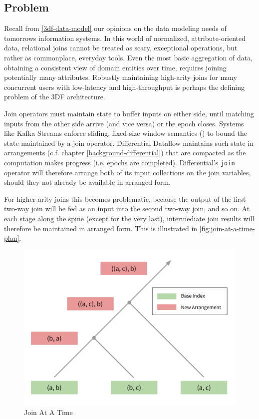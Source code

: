 \documentclass[../catalog.tex]{subfiles}
\begin{document}
\subsection{Problem}

Recall from \autoref{3df-data-model} our opinions on the data modeling
needs of tomorrows information systems. In this world of normalized,
attribute-oriented data, relational joins cannot be treated as scary,
exceptional operations, but rather as commonplace, everyday
tools. Even the most basic aggregation of data, obtaining a consistent
view of domain entities over time, requires joining potentially many
attributes. Robustly maintaining high-arity joins for many concurrent
users with low-latency and high-throughput is perhaps the defining
problem of the 3DF architecture.

Join operators must maintain state to buffer inputs on either side,
until matching inputs from the other side arrive (and vice versa) or
the epoch closes. Systems like Kafka Streams enforce sliding,
fixed-size window semantics (\cite{kafkadocs}) to bound the state
maintained by a join operator. Differential Dataflow maintains such
state in arrangements (c.f. chapter \ref{background-differential})
that are compacted as the computation makes progress (i.e. epochs are
completed). Differential's \texttt{join} operator will therefore
arrange both of its input collections on the join variables, should
they not already be available in arranged form.

For higher-arity joins this becomes problematic, because the output of
the first two-way join will be fed as an input into the second two-way
join, and so on. At each stage along the spine (except for the very
last), intermediate join results will therefore be maintained in
arranged form. This is illustrated in
\autoref{fig:join-at-a-time-plan}.

\begin{figure}[h!]
  \includegraphics[width=1.0\linewidth]{diagrams/join-at-a-time}
  \caption{Join At A Time}
  \label{fig:join-at-a-time-plan}
\end{figure}
\end{document}
